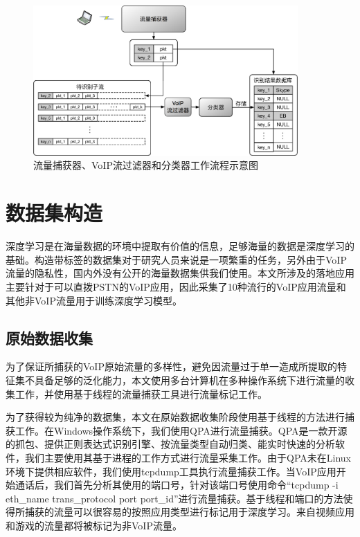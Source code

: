 \begin{figure}[htp]
\begin{center}
\includegraphics[width=0.9\textwidth]{figures/online_3_component.eps}
\caption{流量捕获器、VoIP流过滤器和分类器工作流程示意图}\label{fig:online_3_component}
\end{center}
\end{figure}

\section{数据集构造}
深度学习是在海量数据的环境中提取有价值的信息，足够海量的数据是深度学习的基础。构造带标签的数据集对于研究人员来说是一项繁重的任务，另外由于VoIP流量的隐私性，国内外没有公开的海量数据集供我们使用。本文所涉及的落地应用主要针对于可以直拨PSTN的VoIP应用，因此采集了10种流行的VoIP应用流量和其他非VoIP流量用于训练深度学习模型。

\subsection{原始数据收集}
为了保证所捕获的VoIP原始流量的多样性，避免因流量过于单一造成所提取的特征集不具备足够的泛化能力，本文使用多台计算机在多种操作系统下进行流量的收集工作，并使用基于线程的流量捕获工具进行流量标记工作。


为了获得较为纯净的数据集，本文在原始数据收集阶段使用基于线程的方法进行捕获工作。在Windows操作系统下，我们使用QPA进行流量捕获。QPA是一款开源的抓包、提供正则表达式识别引擎、按流量类型自动归类、能实时快速的分析软件，我们主要使用其基于进程的工作方式进行流量采集工作。由于QPA未在Linux环境下提供相应软件，我们使用tcpdump工具执行流量捕获工作。当VoIP应用开始通话后，我们首先分析其使用的端口号，针对该端口号使用命令“tcpdump -i eth\_name trans\_protocol port port\_id”进行流量捕获。基于线程和端口的方法使得所捕获的流量可以很容易的按照应用类型进行标记用于深度学习。来自视频应用和游戏的流量都将被标记为非VoIP流量。


